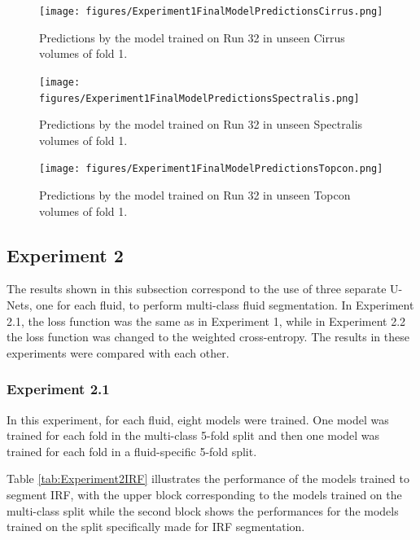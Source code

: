 \begin{figure}[!ht]
	\centering
	\texttt{[image: figures/Experiment1FinalModelPredictionsCirrus.png]}
	\caption{Predictions by the model trained on Run 32 in unseen Cirrus volumes of fold 1.}
	\label{fig:Experiment1FinalModelPredictionsCirrus}
\end{figure}

\begin{figure}[!ht]
	\centering
	\texttt{[image: figures/Experiment1FinalModelPredictionsSpectralis.png]}
	\caption{Predictions by the model trained on Run 32 in unseen Spectralis volumes of fold 1.}
	\label{fig:Experiment1FinalModelPredictionsSpectralis}
\end{figure}

\begin{figure}[!ht]
	\centering
	\texttt{[image: figures/Experiment1FinalModelPredictionsTopcon.png]}
	\caption{Predictions by the model trained on Run 32 in unseen Topcon volumes of fold 1.}
	\label{fig:Experiment1FinalModelPredictionsTopcon}
\end{figure}

\subsection{Experiment 2}
The results shown in this subsection correspond to the use of three separate U-Nets, one for each fluid, to perform multi-class fluid segmentation. In Experiment 2.1, the loss function was the same as in Experiment 1, while in Experiment 2.2 the loss function was changed to the weighted cross-entropy. The results in these experiments were compared with each other.

\subsubsection{Experiment 2.1}
In this experiment, for each fluid, eight models were trained. One model was trained for each fold in the multi-class 5-fold split and then one model was trained for each fold in a fluid-specific 5-fold split.
\par
Table \ref{tab:Experiment2IRF} illustrates the performance of the models trained to segment IRF, with the upper block corresponding to the models trained on the multi-class split while the second block shows the performances for the models trained on the split specifically made for IRF segmentation.

